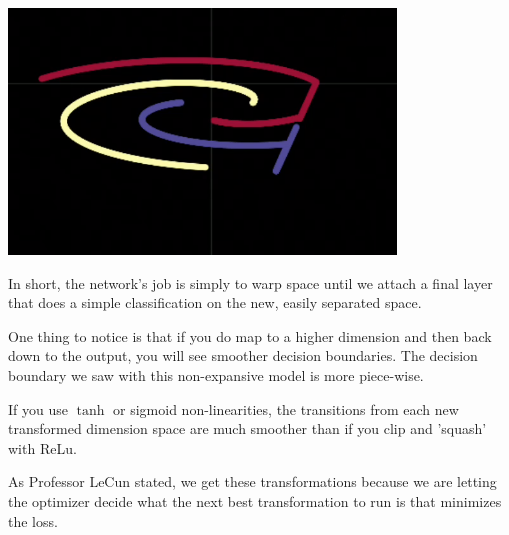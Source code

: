 \begin{center}
	\includegraphics[width=0.85\linewidth]{lectures/03-a/images/squash.png}
\end{center}

In short, the network's job is simply to warp space until we attach a final layer that does a simple classification on the new, easily separated space. 

\noindent{}

One thing to notice is that if you do map to a higher dimension and then back down to the output, you will see smoother decision boundaries. 
The decision boundary we saw with this non-expansive model is more piece-wise.

If you use $\tanh$ or sigmoid non-linearities, the transitions from each new transformed dimension space are much smoother than if you clip and 'squash' with ReLu. 

As Professor LeCun stated, we get these transformations because we are letting the optimizer decide what the next best transformation to run is that minimizes the loss. 

\noindent{}

